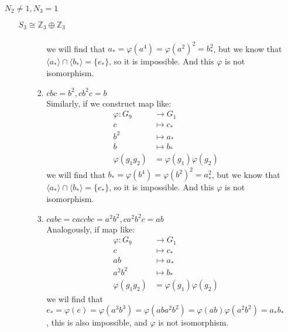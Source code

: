 \documentclass[a4paper,14pt]{article}
\begin{document}
\begin{enumerate}
\begin{item}{$N_2 \neq 1, N_3 = 1$}
\begin{enumerate}
\begin{item}{$S_3\cong \mathbb{Z}_3 \oplus \mathbb{Z}_3$}
\begin{enumerate}
\begin{enumerate}
\begin{align*}
                                    \end{align*}
                                    we will find that $a_* = \varphi(a^4) = \varphi(a^2)^2 = b_*^2$, but we know that $\langle a_* \rangle \cap 
                                    \langle b_* \rangle = \{e_*\}$, so it is impossible. And this $\varphi$ is not isomorphism.
                                \item $cbc = b^2, cb^2c=b$\\
                                    Similarly, if we construct map like:
                                    \begin{align*}
                                        \varphi:G_9 &\to G_1\\
                                        c &\longmapsto c_*\\
                                        b^2 &\longmapsto a_*\\
                                        b &\longmapsto b_*\\
                                        \varphi(g_1g_2) &= \varphi(g_1)\varphi(g_2)
                                    \end{align*}
                                    we will find that $b_* = \varphi(b^4) = \varphi(b^2)^2 = a_*^2$, but we know that $\langle a_* \rangle \cap 
                                    \langle b_* \rangle = \{e_*\}$, so it is impossible. And this $\varphi$ is not isomorphism.
                                \item $cabc = caccbc = a^2b^2, ca^2b^2c=ab$\\
                                    Analogously, if map like:
                                    \begin{align*}
                                        \varphi:G_9 &\to G_1\\
                                        c &\longmapsto c_*\\
                                        ab &\longmapsto a_*\\
                                        a^2b^2 &\longmapsto b_*\\
                                        \varphi(g_1g_2) &= \varphi(g_1)\varphi(g_2)
                                    \end{align*}
                                    we wil find that $e_*=\varphi(e)=\varphi(a^3b^3)=\varphi(aba^2b^2)=\varphi(ab)\varphi(a^2b^2)=a_*b_*$, this 
                                    is also impossible, and $\varphi$ is not isomorphism.

\end{enumerate}
\end{enumerate}
\end{item}
\end{enumerate}
\end{item}
\end{enumerate}
\end{document}
